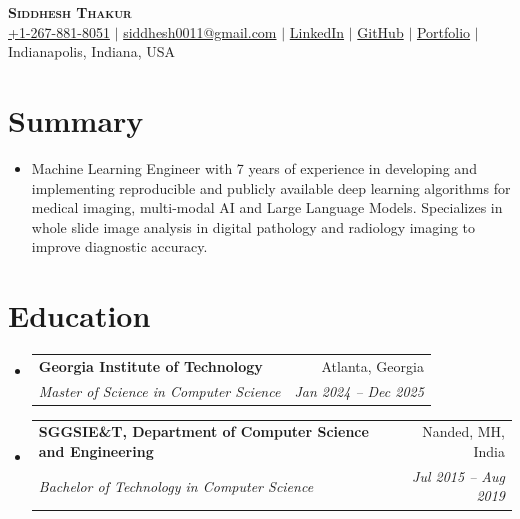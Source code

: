 \documentclass[letterpaper,11pt]{article}
\makeatletter
\newcommand{\resumeItem}[1]{
  \item\small{
    {#1 \vspace{-2pt}}
  }
}
\newcommand{\resumeSubheading}[4]{
  \vspace{-2pt}\item
    \begin{tabular*}{0.97\textwidth}[t]{l@{\extracolsep{\fill}}r}
      \textbf{#1} & #2 \\
      \textit{\small#3} & \textit{\small #4} \\
    \end{tabular*}\vspace{-7pt}
}
\newcommand{\resumeSubHeadingListStart}{\begin{itemize}[leftmargin=0.15in, label={}]}
\newcommand{\resumeSubHeadingListEnd}{\end{itemize}}
\makeatother
\begin{document}

\begin{center}
    \textbf{\Huge \scshape \textbf{Siddhesh Thakur}} \\ \vspace{3pt}
    \small
    \faMobile \hspace{.5pt} \href{tel:+12678818051}{+1-267-881-8051}
    $|$
    \faAt \hspace{.5pt} \href{mailto:siddhesh0011@gmail.com}{siddhesh0011@gmail.com}
    $|$
    \faLinkedinSquare \hspace{.5pt} \href{https://www.linkedin.com/in/siddheshthakur04/}{LinkedIn}
    $|$
    \faGithub \hspace{.5pt} \href{https://github.com/geeks-sid}{GitHub}
    $|$
    \faGlobe \hspace{.5pt} \href{https://geeks-sid.github.io}{Portfolio}
    $|$
    \faMapMarker \hspace{.5pt} Indianapolis, Indiana, USA
\end{center}


\section{Summary}
  \vspace{3pt}
  \resumeSubHeadingListStart
    \resumeItem{Machine Learning Engineer with 7 years of experience in developing and implementing reproducible and publicly available deep learning algorithms for medical imaging, multi-modal AI and Large Language Models. Specializes in whole slide image analysis in digital pathology and radiology imaging to improve diagnostic accuracy.}
  \resumeSubHeadingListEnd


\section{Education}
  \vspace{3pt}
  \resumeSubHeadingListStart
    \resumeSubheading
      {Georgia Institute of Technology}{Atlanta, Georgia}
      {Master of Science in Computer Science}{Jan 2024 -- Dec 2025}
    \resumeSubheading
      {SGGSIE\&T, Department of Computer Science and Engineering}{Nanded, MH, India}
      {Bachelor of Technology in Computer Science}{Jul 2015 -- Aug 2019}
  \resumeSubHeadingListEnd
\end{document}
